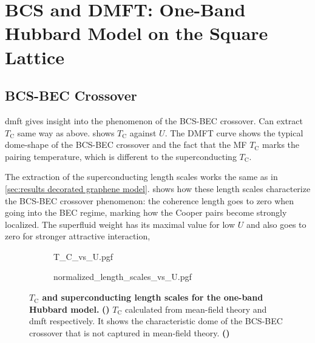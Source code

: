 \documentclass[../notes.tex]{subfiles}
\begin{document}
\clearpage
\section{BCS and DMFT: One-Band Hubbard Model on the Square Lattice}\label{sec:results OBH}

\subsection*{BCS-BEC Crossover}

\Acrshort{dmft} gives insight into the phenomenon of the BCS-BEC crossover.
Can extract \(T_{\mathrm{C}}\) same way as above.
 shows \(T_{\mathrm{C}}\) against \(U\).
The DMFT curve shows the typical dome-shape of the BCS-BEC crossover and the fact that the MF \(T_{\mathrm{C}}\) marks the pairing temperature, which is different to the superconducting \(T_{\mathrm{C}}\). 

The extraction of the superconducting length scales works the same as in \cref{sec:results decorated graphene model}. 
 shows how these length scales characterize the BCS-BEC crossover phenomenon: the coherence length goes to zero when going into the BEC regime, marking how the Cooper pairs become strongly localized. 
The superfluid weight has its maximal value for low \(U\) and also goes to zero for stronger attractive interaction, 
\begin{figure}[tb]
	\centering
	\begin{subfigure}[b]{0.5\textwidth}
		\centering
		\caption{\hfill\null}\label{sfig:DMFT OBH T_C vs U}
		{T_C_vs_U.pgf}
	\end{subfigure}%
	\begin{subfigure}[b]{0.5\textwidth}
		\centering
		\caption{\hfill\null}\label{sfig:DMFT OBH BCS to BEC crossover}
		{normalized_length_scales_vs_U.pgf}
	\end{subfigure}
	\caption[\(T_{\mathrm{C}}\) and superconducting length scales for the one-band Hubbard model.]{
		\textbf{\(T_{\mathrm{C}}\) and superconducting length scales for the one-band Hubbard model.} \textbf{()} \(T_{\mathrm{C}}\) calculated from mean-field theory and \gls{dmft} respectively. It shows the characteristic dome of the BCS-BEC crossover that is not captured in mean-field theory. \textbf{()}  
	}
	\label{fig:DMFT OBH BCS BEC crossover and T_C vs U}
\end{figure}
\end{document}
